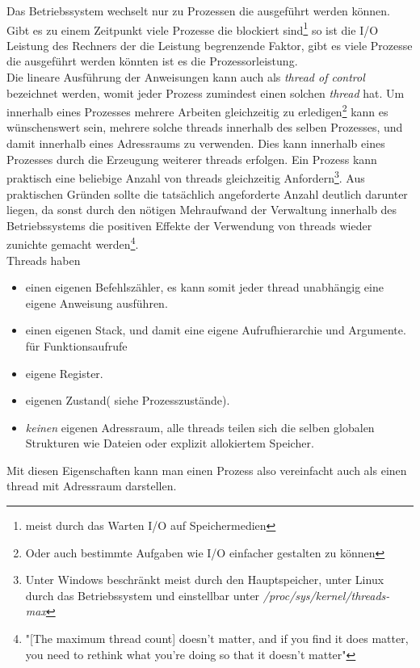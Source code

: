 Das Betriebssystem wechselt nur zu Prozessen die ausgeführt werden können. Gibt es zu einem Zeitpunkt viele Prozesse die blockiert sind\footnote{meist durch das Warten I/O auf Speichermedien} so ist die I/O Leistung des Rechners der die Leistung begrenzende Faktor, gibt es viele Prozesse die ausgeführt werden könnten ist es die Prozessorleistung.
\\Die lineare Ausführung der Anweisungen kann auch als \emph{thread of control} bezeichnet werden, womit jeder Prozess zumindest einen solchen \emph{thread} hat. Um innerhalb eines Prozesses mehrere Arbeiten gleichzeitig zu erledigen\footnote{Oder auch bestimmte Aufgaben wie I/O einfacher gestalten zu können} kann es wünschenswert sein, mehrere solche threads innerhalb des selben Prozesses, und damit innerhalb eines Adressraums zu verwenden. Dies kann innerhalb eines Prozesses durch die Erzeugung weiterer threads erfolgen. Ein Prozess kann praktisch eine beliebige Anzahl von threads gleichzeitig Anfordern\footnote{Unter Windows beschränkt meist durch den Hauptspeicher, unter Linux durch das Betriebssystem und einstellbar unter \textit{/proc/sys/kernel/threads-max}}. Aus praktischen Gründen sollte die tatsächlich angeforderte Anzahl deutlich darunter liegen, da sonst durch den nötigen Mehraufwand der Verwaltung innerhalb des Betriebssystems die positiven Effekte der Verwendung von threads wieder zunichte gemacht werden\footnote{"[The maximum thread count] doesn't matter, and if you find it does matter, you need to rethink what you're doing so that it doesn't matter"\parencite{stacko_threadcount}}.
\\Threads haben \parencite[S. 148]{tanenbaum2016}
\begin{itemize}
	\item einen eigenen Befehlszähler, es kann somit jeder thread unabhängig eine eigene Anweisung ausführen.
	\item einen eigenen Stack, und damit eine eigene Aufrufhierarchie und Argumente. für Funktionsaufrufe
	\item eigene Register.
	\item eigenen Zustand( siehe Prozesszustände).
	\item \emph{keinen} eigenen Adressraum, alle threads teilen sich die selben globalen Strukturen wie Dateien oder explizit allokiertem Speicher.
\end{itemize}	
Mit diesen Eigenschaften kann man einen Prozess also vereinfacht auch als einen thread mit Adressraum darstellen.\parencite[S. 1]{butenhof1997}
